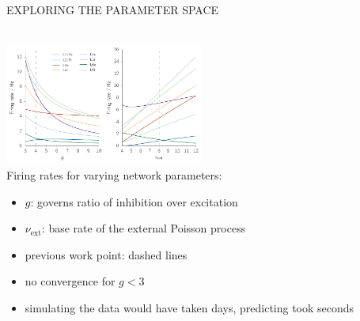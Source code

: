 \documentclass[portrait, final, a0paper, fontscale=0.34, leqno]{baposter}
\begin{document}
\begin{poster}
{\begin{minipage}{0.98\linewidth}
    \vspace{0.3cm}
    \centerline{\uppercase{Exploring the parameter space}}
    \begin{multicols}{2}
        ~\\
        \includegraphics[height=4cm]{change_parameters} 
        \columnbreak \\
        Firing rates for varying network parameters:
        \vspace{-\topsep}
        \begin{itemize}
            \setlength\itemsep{0.01cm}
            \item $g$: governs ratio of inhibition over excitation
            \item $\nu_\text{ext}$: base rate of the external Poisson process
            \item previous work point: dashed lines
            \item no convergence for $g < 3$
            \item simulating the data would have taken days, predicting took seconds
        \end{itemize}
    \end{multicols}
\end{minipage}
}




\end{poster}
\end{document}
